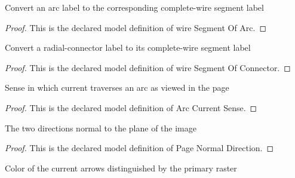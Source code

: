 \begin{definition}
  \label{def:physics:phyx-mini-0966:phyxminiproblems-problemphyxmini0966-wiresegmentofarc}
  Convert an arc label to the corresponding complete-wire segment label
\end{definition}
\begin{proof}
  This is the declared model definition of wire Segment Of Arc.
\end{proof}
\begin{definition}
  \label{def:physics:phyx-mini-0966:phyxminiproblems-problemphyxmini0966-wiresegmentofconnector}
  Convert a radial-connector label to its complete-wire segment label
\end{definition}
\begin{proof}
  This is the declared model definition of wire Segment Of Connector.
\end{proof}
\begin{definition}
  \label{def:physics:phyx-mini-0966:phyxminiproblems-problemphyxmini0966-arccurrentsense}
  Sense in which current traverses an arc as viewed in the page
\end{definition}
\begin{proof}
  This is the declared model definition of Arc Current Sense.
\end{proof}
\begin{definition}
  \label{def:physics:phyx-mini-0966:phyxminiproblems-problemphyxmini0966-pagenormaldirection}
  The two directions normal to the plane of the image
\end{definition}
\begin{proof}
  This is the declared model definition of Page Normal Direction.
\end{proof}
\begin{definition}
  \label{def:physics:phyx-mini-0966:phyxminiproblems-problemphyxmini0966-figurecolor}
  Color of the current arrows distinguished by the primary raster
\end{definition}
